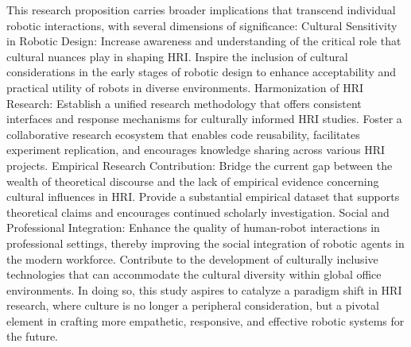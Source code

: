 This research proposition carries broader implications that transcend individual robotic interactions, with several dimensions of significance:
Cultural Sensitivity in Robotic Design:
Increase awareness and understanding of the critical role that cultural nuances play in shaping HRI.
Inspire the inclusion of cultural considerations in the early stages of robotic design to enhance acceptability and practical utility of robots in diverse environments.
Harmonization of HRI Research:
Establish a unified research methodology that offers consistent interfaces and response mechanisms for culturally informed HRI studies.
Foster a collaborative research ecosystem that enables code reusability, facilitates experiment replication, and encourages knowledge sharing across various HRI projects.
Empirical Research Contribution:
Bridge the current gap between the wealth of theoretical discourse and the lack of empirical evidence concerning cultural influences in HRI.
Provide a substantial empirical dataset that supports theoretical claims and encourages continued scholarly investigation.
Social and Professional Integration:
Enhance the quality of human-robot interactions in professional settings, thereby improving the social integration of robotic agents in the modern workforce.
Contribute to the development of culturally inclusive technologies that can accommodate the cultural diversity within global office environments.
In doing so, this study aspires to catalyze a paradigm shift in HRI research, where culture is no longer a peripheral consideration, but a pivotal element in crafting more empathetic, responsive, and effective robotic systems for the future.

